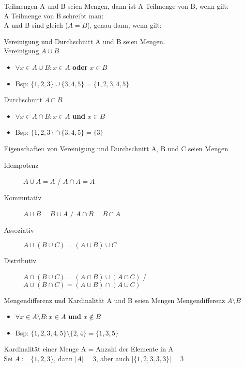 \begin{frame}{Teilmengen}
 A und B seien Mengen, dann ist A Teilmenge von B, wenn gilt:
 \\
 A Teilmenge von B schreibt man:
 \\
 A und B sind gleich ($A = B$), genau dann, wenn gilt:
\end{frame}

\begin{frame}{Vereinigung und Durchschnitt}
 A und B seien Mengen.\\
 \underline{Vereinigung $A\cup B$}
 \begin{itemize}
  \item $\forall x\in A\cup B: x\in A$ \textbf{oder} $x\in B$
  \item Bsp: $\{1, 2, 3\}\cup \{3, 4, 5\} = \{1, 2, 3, 4, 5\}$
 \end{itemize}
 Durchschnitt $A\cap B$
 \begin{itemize}
  \item $\forall x\in A\cap B: x\in A$ \textbf{und} $x\in B$
  \item Bsp: $\{1, 2, 3\}\cap \{3, 4, 5\} = \{3\}$
 \end{itemize}
\end{frame}

\begin{frame}{Eigenschaften von Vereinigung und Durchschnitt}
 A, B und C seien Mengen
 \begin{description}
  \item[Idempotenz] $A\cup A = A$ / $A\cap A = A$
  \item[Kommutativ] $A\cup B = B\cup A$ / $A\cap B = B\cap A$
  \item[Assoziativ] $A\cup (B\cup C) = (A\cup B) \cup C$
  \item[Distributiv] $A\cap (B\cup C) = (A\cap B)\cup (A\cap C)$ / $A\cup (B\cap C) = (A\cup B)\cap (A\cup C)$
 \end{description}
\end{frame}

\begin{frame}{Mengendifferenz und Kardinalität}
 A und B seien Mengen
 Mengendifferenz $A\setminus B$
 \begin{itemize}
  \item $\forall x\in A\setminus B: x\in A$ \textbf{und} $x\notin B$
  \item Bsp: $\{1, 2, 3, 4, 5\} \setminus \{2, 4\} = \{1, 3, 5\}$
 \end{itemize}
 Kardinalität einer Menge A = Anzahl der Elemente in A\\
 Sei $A := \{1, 2, 3\}$, dann $\lvert A\rvert = 3$, aber auch $\lvert \{1, 2, 3, 3, 3\}\rvert = 3$
\end{frame}

